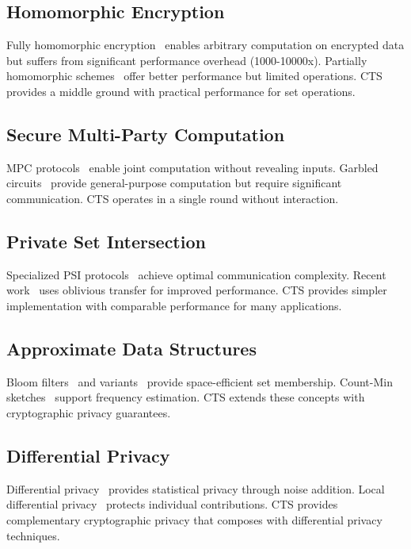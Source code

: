 \documentclass[10pt,conference]{IEEEtran}
\begin{document}
\subsection{Homomorphic Encryption}

Fully homomorphic encryption~\cite{gentry2009fully} enables arbitrary computation on encrypted data but suffers from significant performance overhead (1000-10000x). Partially homomorphic schemes~\cite{paillier1999public} offer better performance but limited operations. CTS provides a middle ground with practical performance for set operations.

\subsection{Secure Multi-Party Computation}

MPC protocols~\cite{yao1982protocols, goldreich1987play} enable joint computation without revealing inputs. Garbled circuits~\cite{bellare2012foundations} provide general-purpose computation but require significant communication. CTS operates in a single round without interaction.

\subsection{Private Set Intersection}

Specialized PSI protocols~\cite{meadows1986more, freedman2004efficient} achieve optimal communication complexity. Recent work~\cite{kolesnikov2016efficient} uses oblivious transfer for improved performance. CTS provides simpler implementation with comparable performance for many applications.

\subsection{Approximate Data Structures}

Bloom filters~\cite{bloom1970space} and variants~\cite{fan2000summary} provide space-efficient set membership. Count-Min sketches~\cite{cormode2005improved} support frequency estimation. CTS extends these concepts with cryptographic privacy guarantees.

\subsection{Differential Privacy}

Differential privacy~\cite{dwork2006calibrating} provides statistical privacy through noise addition. Local differential privacy~\cite{kasiviswanathan2011what} protects individual contributions. CTS provides complementary cryptographic privacy that composes with differential privacy techniques.
\end{document}
